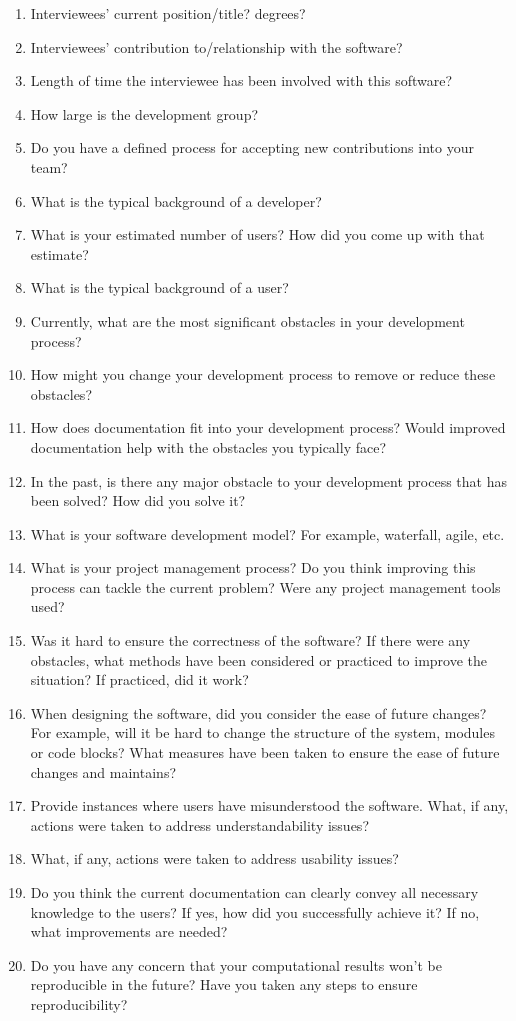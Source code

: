\documentclass[12pt, notitlepage]{article}
\begin{document}
\begin{appendices}
\begin{singlespace}
\begin{enumerate}
	\item Interviewees’ current position/title? degrees?
	\item Interviewees’ contribution to/relationship with the software?
	\item Length of time the interviewee has been involved with this software?
	\item How large is the development group?
	\item Do you have a defined process for accepting new contributions into your team?
	\item What is the typical background of a developer?
	\item What is your estimated number of users? How did you come up with that estimate?
	\item What is the typical background of a user?
	\item Currently, what are the most significant obstacles in your development process?
	\item How might you change your development process to remove or reduce these obstacles?
	\item How does documentation fit into your development process? Would improved documentation help with the obstacles you typically face?
	\item In the past, is there any major obstacle to your development process that has been solved? How did you solve it?
	\item What is your software development model? For example, waterfall, agile, etc.
	\item What is your project management process? Do you think improving this process can
	tackle the current problem? Were any project management tools used?
	\item Was it hard to ensure the correctness of the software? If there were any obstacles, what methods have been considered or practiced to improve the situation? If practiced, did it work?
	\item When designing the software, did you consider the ease of future changes? For example, will it be hard to change the structure of the system, modules or code blocks? What measures have been taken to ensure the ease of future changes and maintains?
	\item Provide instances where users have misunderstood the software. What, if any, actions were taken to address understandability issues?
	\item What, if any, actions were taken to address usability issues?
	\item Do you think the current documentation can clearly convey all necessary knowledge to the users? If yes, how did you successfully achieve it? If no, what improvements are needed?
	\item Do you have any concern that your computational results won’t be reproducible in the future? Have you taken any steps to ensure reproducibility? 
	

\end{enumerate}
\end{singlespace}
\end{appendices}
\end{document}

